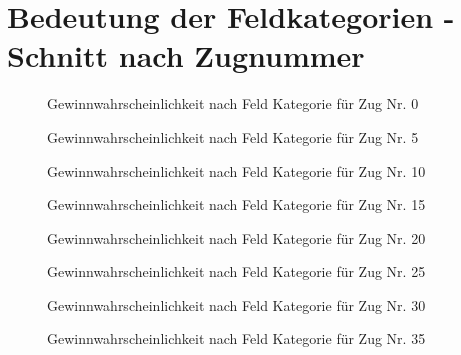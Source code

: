 \chapter{Bedeutung der Feldkategorien - Schnitt nach Zugnummer}
\label{Anhang:Abb2}
\begin{figure}[ht]
\centering
{}
\caption{Gewinnwahrscheinlichkeit nach Feld Kategorie für Zug Nr. 0}
\label{fig:win-pro-turn-0}
\end{figure}
\begin{figure}[ht]
\centering
{}
\caption{Gewinnwahrscheinlichkeit nach Feld Kategorie für Zug Nr. 5}
\label{fig:win-pro-turn-5}
\end{figure}
\begin{figure}[ht]
\centering
{}
\caption{Gewinnwahrscheinlichkeit nach Feld Kategorie für Zug Nr. 10}
\label{fig:win-pro-turn-10}
\end{figure}
\begin{figure}[ht]
\centering
{}
\caption{Gewinnwahrscheinlichkeit nach Feld Kategorie für Zug Nr. 15}
\label{fig:win-pro-turn-15}
\end{figure}
\begin{figure}[ht]
\centering
{}
\caption{Gewinnwahrscheinlichkeit nach Feld Kategorie für Zug Nr. 20}
\label{fig:win-pro-turn-20}
\end{figure}
\begin{figure}[ht]
\centering
{}
\caption{Gewinnwahrscheinlichkeit nach Feld Kategorie für Zug Nr. 25}
\label{fig:win-pro-turn-25}
\end{figure}
\begin{figure}[ht]
\centering
{}
\caption{Gewinnwahrscheinlichkeit nach Feld Kategorie für Zug Nr. 30}
\label{fig:win-pro-turn-30}
\end{figure}
\begin{figure}[ht]
\centering
{}
\caption{Gewinnwahrscheinlichkeit nach Feld Kategorie für Zug Nr. 35}
\label{fig:win-pro-turn-35}
\end{figure}

